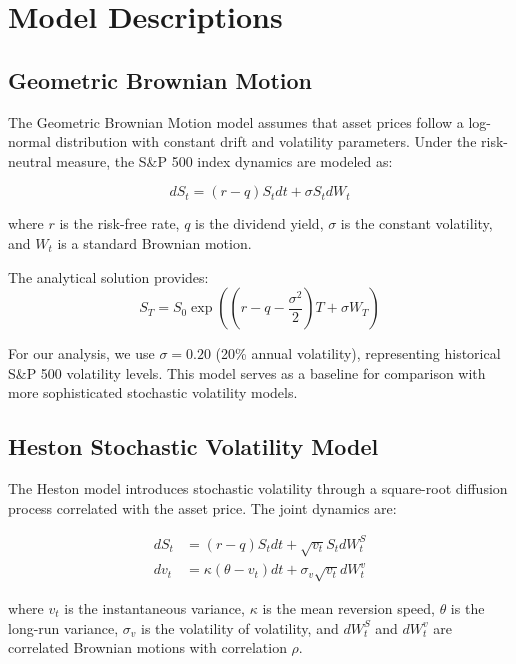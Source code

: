 \documentclass[12pt,a4paper]{report}
\begin{document}
\chapter{Model Descriptions}

\section{Geometric Brownian Motion}

The Geometric Brownian Motion model assumes that asset prices follow a log-normal distribution with constant drift and volatility parameters. Under the risk-neutral measure, the S\&P 500 index dynamics are modeled as:

\begin{equation}
dS_t = (r - q)S_t dt + \sigma S_t dW_t
\end{equation}

where $r$ is the risk-free rate, $q$ is the dividend yield, $\sigma$ is the constant volatility, and $W_t$ is a standard Brownian motion.

The analytical solution provides:
\begin{equation}
S_T = S_0 \exp\left((r - q - \frac{\sigma^2}{2})T + \sigma W_T\right)
\end{equation}

For our analysis, we use $\sigma = 0.20$ (20\% annual volatility), representing historical S\&P 500 volatility levels. This model serves as a baseline for comparison with more sophisticated stochastic volatility models.

\section{Heston Stochastic Volatility Model}

The Heston model introduces stochastic volatility through a square-root diffusion process correlated with the asset price. The joint dynamics are:

\begin{align}
dS_t &= (r - q)S_t dt + \sqrt{v_t}S_t dW_t^S\\
dv_t &= \kappa(\theta - v_t)dt + \sigma_v\sqrt{v_t}dW_t^v
\end{align}

where $v_t$ is the instantaneous variance, $\kappa$ is the mean reversion speed, $\theta$ is the long-run variance, $\sigma_v$ is the volatility of volatility, and $dW_t^S$ and $dW_t^v$ are correlated Brownian motions with correlation $\rho$.
\end{document}
